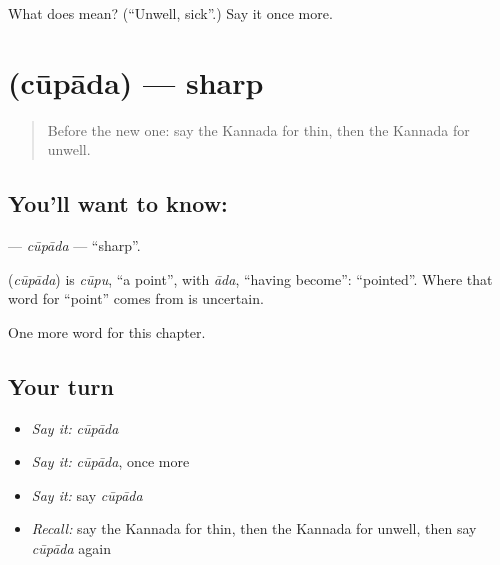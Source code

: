 \begin{tcolorbox}[breakable,colback=teal!4,colframe=teal!35!black,title={Before you move on}]
What does  mean? (\textquotedblleft{}Unwell, sick\textquotedblright{}.) Say it once more.
\end{tcolorbox}
\section[\texorpdfstring{\kn{ಚೂಪಾದ} (cūpāda)}{ಚೂಪಾದ (cūpāda)}]{ (cūpāda) — sharp}

\label{lesson:KA-C254-cupada}



\begin{quote}
Before the new one: say the Kannada for thin, then the Kannada for unwell.
\end{quote}

\subsection*{You'll want to know: }
\textbf{} — \emph{cūpāda} — \textquotedblleft{}sharp\textquotedblright{}.

\begin{cousinweb}
\textbf{} (\emph{cūpāda}) is \emph{cūpu}, \textquotedblleft{}a point\textquotedblright{}, with \emph{āda}, \textquotedblleft{}having become\textquotedblright{}: \textquotedblleft{}pointed\textquotedblright{}. Where that word for \textquotedblleft{}point\textquotedblright{} comes from is uncertain.
\end{cousinweb}

\begin{grammarlens}[title={What you've built}]
One more word for this chapter.
\end{grammarlens}

\subsection*{Your turn}
\begin{itemize}
\raggedright
  \item \emph{Say it:} \emph{cūpāda}
  \item \emph{Say it:} \emph{cūpāda}, once more
  \item \emph{Say it:} say \emph{cūpāda}
  \item \emph{Recall:} say the Kannada for thin, then the Kannada for unwell, then say \emph{cūpāda} again
\end{itemize}

